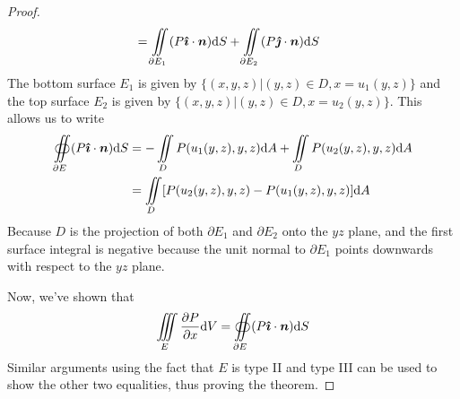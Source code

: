 \begin{proof}
\begin{align*}
        &= \iint\limits_{\partial E_1}(P\boldsymbol{\hat{\imath}} \cdot \boldsymbol{n})\dd S + \iint\limits_{\partial E_2}(P\boldsymbol{\hat{\jmath}}\cdot\boldsymbol{n})\dd S
    \end{align*}
    The bottom surface $E_1$ is given by $\{(x,y,z)|(y,z)\in D, x=u_1(y,z)\}$ and the top surface $E_2$ is given by $\{(x,y,z)|(y,z)\in D, x=u_2(y,z)\}$. This allows us to write
    \begin{align*}
        \oiint\limits_{\partial E}(P\boldsymbol{\hat{\imath}} \cdot \boldsymbol{n})\dd S &= -\iint\limits_D P(u_1(y,z),y,z)\dd A + \iint\limits_D P(u_2(y,z),y,z)\dd A \\
        &= \iint\limits_D [P(u_2(y,z),y,z) - P(u_1(y,z),y,z)]\dd A
    \end{align*}
    Because $D$ is the projection of both $\partial E_1$ and $\partial E_2$ onto the $yz$ plane, and the first surface integral is negative because the unit normal to $\partial E_1$ points downwards with respect to the $yz$ plane. \par
    Now, we've shown that 
    \[ \iiint\limits_E \pdv{P}{x}\dd V = \oiint\limits_{\partial E}(P\boldsymbol{\hat{\imath}} \cdot \boldsymbol{n})\dd S\]
    Similar arguments using the fact that $E$ is type II and type III can be used to show the other two equalities, thus proving the theorem.
\end{proof}

